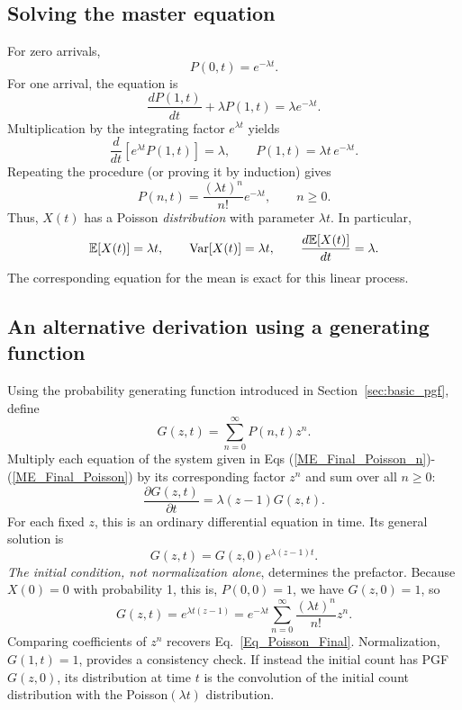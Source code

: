 \subsection{Solving the master equation}
For zero arrivals,
\begin{equation}
 P(0,t)=e^{-\lambda t}.
\end{equation}
For one arrival, the equation is
\begin{equation}
 \frac{dP(1,t)}{dt}+\lambda P(1,t)=\lambda e^{-\lambda t}.
\end{equation}
Multiplication by the integrating factor $e^{\lambda t}$ yields
\begin{equation}
 \frac{d}{dt}\left[e^{\lambda t}P(1,t)\right]=\lambda,
 \qquad P(1,t)=\lambda t\,e^{-\lambda t}.
\end{equation}
Repeating the procedure (or proving it by induction) gives
\begin{equation}
 \boxed{P(n,t)=\frac{(\lambda t)^n}{n!}e^{-\lambda t},\qquad n\geq0.}
 \label{Eq_Poisson_Final}
\end{equation}
Thus, $X(t)$ has a Poisson \emph{distribution} with parameter $\lambda t$.
In particular,
\begin{equation}
 {\mathbb E}[X(t)]=\lambda t,\qquad \operatorname{Var}[X(t)]=\lambda t,
 \qquad\frac{d{\mathbb E}[X(t)]}{dt}=\lambda.
 \label{ODE_Average}
\end{equation}
The corresponding equation for the mean is exact for this linear process.

\subsection{An alternative derivation using a generating function}
Using the probability generating function introduced in
Section~\ref{sec:basic_pgf}, define
\begin{equation}
 G(z,t)=\sum_{n=0}^{\infty}P(n,t)z^n.
\end{equation}
Multiply each equation of the system given in Eqs (\ref{ME_Final_Poisson_n})-(\ref{ME_Final_Poisson}) by its corresponding factor $z^n$ and sum over all $n\geq0$:
\begin{equation}
 \frac{\partial G(z,t)}{\partial t}=\lambda(z-1)G(z,t).
 \label{GenFunc_Poisson}
\end{equation}
For each fixed $z$, this is an ordinary differential equation in time.
Its general solution is
\begin{equation}
 G(z,t)=G(z,0)e^{\lambda(z-1)t}.
\end{equation}
\emph{The initial condition, not normalization alone}, determines the
prefactor. Because $X(0)=0$ with probability 1, this is, $P(0,0)=1$, we have $G(z,0)=1$, so
\begin{equation}
 G(z,t)=e^{\lambda t(z-1)}
 =e^{-\lambda t}\sum_{n=0}^{\infty}\frac{(\lambda t)^n}{n!}z^n.
\end{equation}
Comparing coefficients of $z^n$ recovers Eq.~\eqref{Eq_Poisson_Final}.
Normalization, $G(1,t)=1$, provides a consistency check.
If instead the initial count has PGF $G(z,0)$, its distribution at time
$t$ is the convolution of the initial count distribution with the
Poisson$(\lambda t)$ distribution.

